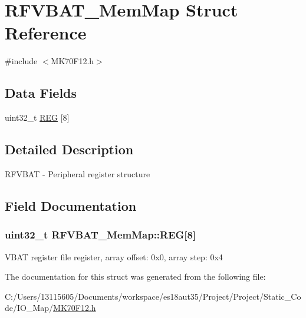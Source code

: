\hypertarget{struct_r_f_v_b_a_t___mem_map}{}\section{R\+F\+V\+B\+A\+T\+\_\+\+Mem\+Map Struct Reference}
\label{struct_r_f_v_b_a_t___mem_map}


{\ttfamily \#include $<$M\+K70\+F12.\+h$>$}

\subsection*{Data Fields}
\begin{DoxyCompactItemize}
\item 
uint32\+\_\+t \hyperlink{struct_r_f_v_b_a_t___mem_map_a21ddc52aa162e182f22011520b5bf93b}{R\+E\+G} \mbox{[}8\mbox{]}
\end{DoxyCompactItemize}


\subsection{Detailed Description}
R\+F\+V\+B\+A\+T -\/ Peripheral register structure 

\subsection{Field Documentation}
\hypertarget{struct_r_f_v_b_a_t___mem_map_a21ddc52aa162e182f22011520b5bf93b}{}
\subsubsection[{R\+E\+G}]{\setlength{\rightskip}{0pt plus 5cm}uint32\+\_\+t R\+F\+V\+B\+A\+T\+\_\+\+Mem\+Map\+::\+R\+E\+G\mbox{[}8\mbox{]}}\label{struct_r_f_v_b_a_t___mem_map_a21ddc52aa162e182f22011520b5bf93b}
V\+B\+A\+T register file register, array offset\+: 0x0, array step\+: 0x4 

The documentation for this struct was generated from the following file\+:\begin{DoxyCompactItemize}
\item 
C\+:/\+Users/13115605/\+Documents/workspace/es18aut35/\+Project/\+Project/\+Static\+\_\+\+Code/\+I\+O\+\_\+\+Map/\hyperlink{_m_k70_f12_8h}{M\+K70\+F12.\+h}\end{DoxyCompactItemize}
